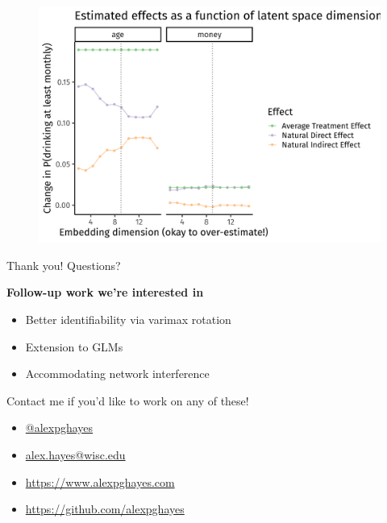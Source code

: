 \documentclass{beamer}
\theoremstyle{remark}
\begin{document}
\begin{frame}
    \centering
    \vspace{3mm}
    \begin{figure}
        \includegraphics[width=\textwidth]{figures/glasgow-estimates.png}
    \end{figure}
\end{frame}


\begin{frame}{Thank you! Questions?}

    \textbf{Follow-up work we're interested in}

    \begin{itemize}
        \item Better identifiability via varimax rotation
        \item Extension to GLMs
        \item Accommodating network interference
    \end{itemize}

    Contact me if you'd like to work on any of these!

    \begin{itemize}
        \item[]  \href{https://twitter.com/alexpghayes}{@alexpghayes}
        \item[]  \href{mailto:alex.hayes@wisc.edu}{alex.hayes@wisc.edu}
        \item[]  \url{https://www.alexpghayes.com} %
        \item[]  \url{https://github.com/alexpghayes}
    \end{itemize}

\end{frame}
\end{document}
